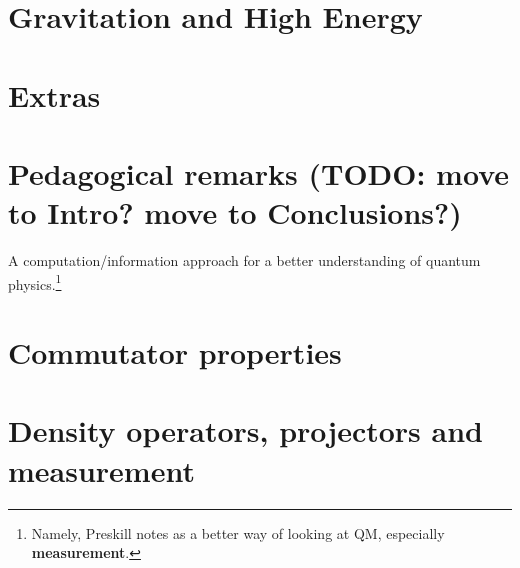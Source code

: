 \documentclass[oneside]{book}
\begin{document}
\chapter{Gravitation and High Energy}



\chapter{Extras}


\chapter{Pedagogical remarks (TODO: move to Intro? move to Conclusions?)}
A computation/information approach for a better understanding of quantum
physics.\footnote{
  Namely, Preskill notes \cite{PreskillNotes} as a better way of looking at QM,
  especially \textbf{measurement}.
}

\appendix
\chapter{Commutator properties}

\chapter{Density operators, projectors and measurement}


\printbibliography[title=References]
\end{document}
